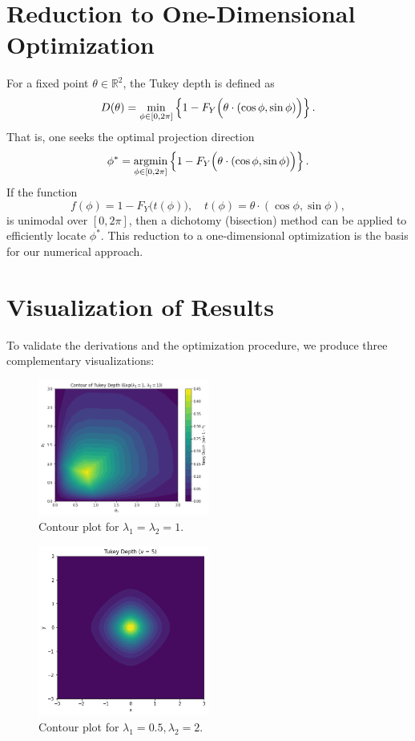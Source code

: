 \section{Reduction to One-Dimensional Optimization}
For a fixed point \(\theta\in\mathbb{R}^2\), the Tukey depth is defined as
\[
D(\theta)=\min_{\phi\in[0,2\pi]}\left\{1-F_Y\Bigl(\theta\cdot(\cos\phi,\sin\phi)\Bigr)\right\}.
\]
That is, one seeks the optimal projection direction
\[
\phi^*=\operatorname*{argmin}_{\phi\in[0,2\pi]}\left\{1-F_Y\Bigl(\theta\cdot(\cos\phi,\sin\phi)\Bigr)\right\}.
\]
If the function
\[
f(\phi)=1-F_Y\bigl(t(\phi)\bigr),\quad t(\phi)=\theta\cdot(\cos\phi,\sin\phi),
\]
is unimodal over \([0,2\pi]\), then a dichotomy (bisection) method can be applied to efficiently locate \(\phi^*\). This reduction to a one-dimensional optimization is the basis for our numerical approach.

\section{Visualization of Results}

To validate the derivations and the optimization procedure, we produce three complementary visualizations:

\begin{figure}[htbp]
  \centering
  \includegraphics[width=0.5\textwidth]{images/TD_exp1.png}
  \caption{Contour plot for $\lambda_1=\lambda_2=1$.}
  \label{fig:1.1}
\end{figure}

\begin{figure}[htbp]
  \centering
  \includegraphics[width=0.5\textwidth]{images/TD_v5.png}
  \caption{Contour plot for $\lambda_1=0.5,\lambda_2=2$.}
  \label{fig:1.2}
\end{figure}

